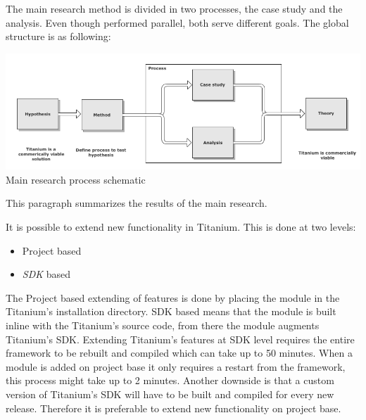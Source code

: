 \noindent The main research method is divided in two processes, the case study and the analysis. Even though performed parallel, both serve different goals. The global structure is as following:\\

\begin{centering}
\includegraphics[scale=0.5]{images/process.png}\\{Main research process schematic}\\
\end{centering}





This paragraph summarizes the results of the main research.

It is possible to extend new functionality in Titanium. This is done at two levels:
\begin{itemize}
	\item Project based
	\item \emph{SDK} based
\end{itemize}
The Project based extending of features is done by placing the module in the Titanium's installation directory. SDK based means that the module is built inline with the Titanium's source code, from there the module augments Titanium's SDK.  Extending Titanium's features at SDK level requires the entire framework to be rebuilt and compiled which can take up to 50 minutes. When a module is added on project base it only requires a restart from the framework, this process might take up to 2 minutes. Another downside is that a custom version of Titanium's SDK will have to be built and compiled for every new release. Therefore it is preferable to extend new functionality on project base.

